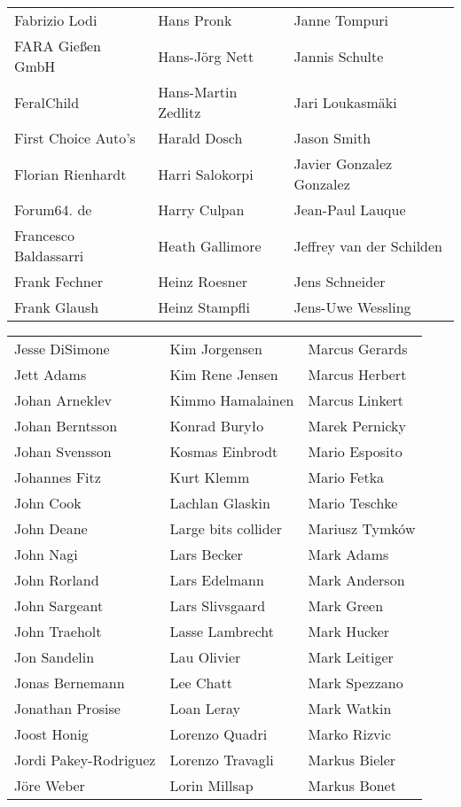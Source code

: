\begin{small}
\begin{tabular}{p{4cm}p{4cm}p{4cm}}
Fabrizio Lodi & Hans Pronk & Janne Tompuri \\
FARA Gießen GmbH & Hans-Jörg Nett & Jannis Schulte \\
FeralChild & Hans-Martin Zedlitz & Jari Loukasmäki \\
First Choice Auto's & Harald Dosch & Jason Smith \\
Florian Rienhardt & Harri Salokorpi & Javier Gonzalez Gonzalez \\
Forum64. de & Harry Culpan & Jean-Paul Lauque \\
Francesco Baldassarri & Heath Gallimore & Jeffrey van der Schilden \\
Frank Fechner & Heinz Roesner & Jens Schneider \\
Frank Glaush & Heinz Stampfli & Jens-Uwe Wessling \\
\end{tabular}
\newpage
\setlength{\tabcolsep}{1mm}
\begin{tabular}{p{4cm}p{4cm}p{4cm}}
Jesse DiSimone & Kim Jorgensen & Marcus Gerards \\
Jett Adams & Kim Rene Jensen & Marcus Herbert \\
Johan Arneklev & Kimmo Hamalainen & Marcus Linkert \\
Johan Berntsson & Konrad Buryło & Marek Pernicky \\
Johan Svensson & Kosmas Einbrodt & Mario Esposito \\
Johannes Fitz & Kurt Klemm & Mario Fetka \\
John Cook & Lachlan Glaskin & Mario Teschke \\
John Deane & Large bits collider & Mariusz Tymków \\
John Nagi & Lars Becker & Mark Adams \\
John Rorland & Lars Edelmann & Mark Anderson \\
John Sargeant & Lars Slivsgaard & Mark Green \\
John Traeholt & Lasse Lambrecht & Mark Hucker \\
Jon Sandelin & Lau Olivier & Mark Leitiger \\
Jonas Bernemann & Lee Chatt & Mark Spezzano \\
Jonathan Prosise & Loan Leray & Mark Watkin \\
Joost Honig & Lorenzo Quadri & Marko Rizvic \\
Jordi Pakey-Rodriguez & Lorenzo Travagli & Markus Bieler \\
Jöre Weber & Lorin Millsap & Markus Bonet \\

\end{tabular}
\end{small}
